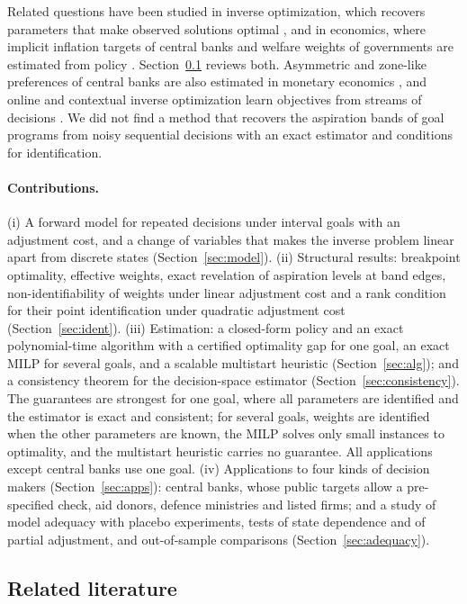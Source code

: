 \documentclass[pdflatex,sn-basic]{sn-jnl}
\theoremstyle{thmstyleone}\newtheorem{proposition}{Proposition}\newtheorem{theorem}{Theorem}
\theoremstyle{thmstylethree}\newtheorem{remark}{Remark}
\begin{document}
Related questions have been studied in inverse optimization, which recovers parameters that make observed solutions optimal \citep{ahuja2001,chan2025review}, and in economics, where implicit inflation targets of central banks and welfare weights of governments are estimated from policy \citep{dennis2006,hendren2020}. Section~\ref{sec:lit} reviews both. Asymmetric and zone-like preferences of central banks are also estimated in monetary economics \citep{orphanides2002,rugemurcia2003,kilian2008}, and online and contextual inverse optimization learn objectives from streams of decisions \citep{besbes2025}. We did not find a method that recovers the aspiration bands of goal programs from noisy sequential decisions with an exact estimator and conditions for identification.

\paragraph{Contributions.} (i) A forward model for repeated decisions under interval goals with an adjustment cost, and a change of variables that makes the inverse problem linear apart from discrete states (Section~\ref{sec:model}). (ii) Structural results: breakpoint optimality, effective weights, exact revelation of aspiration levels at band edges, non-identifiability of weights under linear adjustment cost and a rank condition for their point identification under quadratic adjustment cost (Section~\ref{sec:ident}). (iii) Estimation: a closed-form policy and an exact polynomial-time algorithm with a certified optimality gap for one goal, an exact MILP for several goals, and a scalable multistart heuristic (Section~\ref{sec:alg}); and a consistency theorem for the decision-space estimator (Section~\ref{sec:consistency}). The guarantees are strongest for one goal, where all parameters are identified and the estimator is exact and consistent; for several goals, weights are identified when the other parameters are known, the MILP solves only small instances to optimality, and the multistart heuristic carries no guarantee. All applications except central banks use one goal. (iv) Applications to four kinds of decision makers (Section~\ref{sec:apps}): central banks, whose public targets allow a pre-specified check, aid donors, defence ministries and listed firms; and a study of model adequacy with placebo experiments, tests of state dependence and of partial adjustment, and out-of-sample comparisons (Section~\ref{sec:adequacy}).

\subsection{Related literature}\label{sec:lit}
\end{document}
